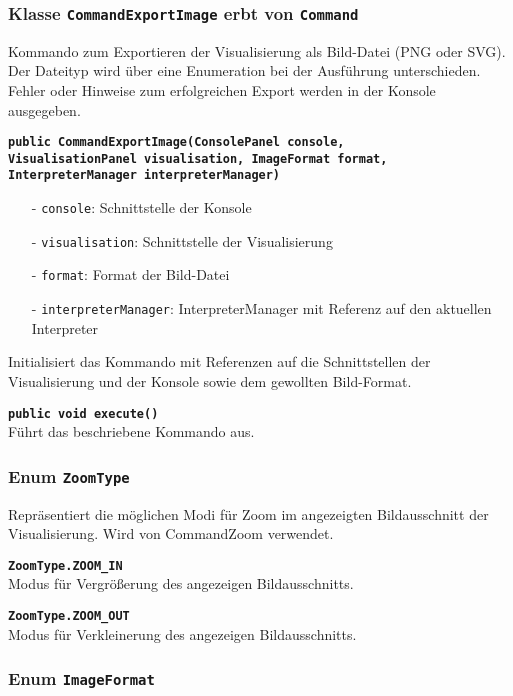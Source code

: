 \documentclass[parskip=full,11pt,twoside]{scrartcl}
\begin{document}
\subsubsection{Klasse \texttt{CommandExportImage} erbt von \texttt{Command}}

Kommando zum Exportieren der Visualisierung als Bild-Datei (PNG oder SVG). Der Dateityp wird über eine Enumeration bei der Ausführung unterschieden. Fehler oder Hinweise zum erfolgreichen Export werden in der Konsole ausgegeben.

\textbf{\texttt{public CommandExportImage(ConsolePanel console,\\VisualisationPanel visualisation, ImageFormat format, InterpreterManager interpreterManager)}}
\begin{itemize}[noitemsep]
	\item[-] \texttt{console}: Schnittstelle der Konsole
	\item[-] \texttt{visualisation}: Schnittstelle der Visualisierung
	\item[-] \texttt{format}: Format der Bild-Datei
	\item[-] \texttt{interpreterManager}: InterpreterManager mit Referenz auf den aktuellen Interpreter
\end{itemize}
Initialisiert das Kommando mit Referenzen auf die Schnittstellen der Visualisierung und der Konsole sowie dem gewollten Bild-Format.

\textbf{\texttt{public void execute()}}\\
Führt das beschriebene Kommando aus.

\subsubsection{Enum \texttt{ZoomType}}

Repräsentiert die möglichen Modi für Zoom im angezeigten Bildausschnitt der Visualisierung. Wird von CommandZoom verwendet.

\textbf{\texttt{ZoomType.ZOOM\_IN}}\\
Modus für Vergrößerung des angezeigen Bildausschnitts.

\textbf{\texttt{ZoomType.ZOOM\_OUT}}\\
Modus für Verkleinerung des angezeigen Bildausschnitts.

\subsubsection{Enum \texttt{ImageFormat}}
\end{document}
